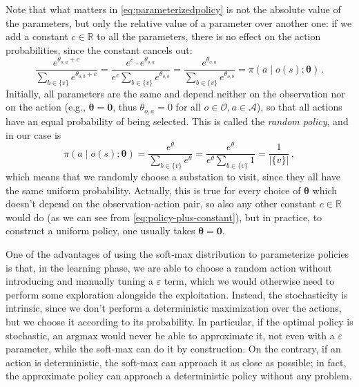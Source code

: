 Note that what matters in \eqref{eq:parameterizedpolicy} is not the absolute value of the parameters, but only the relative value of a parameter over another one: if we add a constant $c \in \mathbb R$ to all the parameters, there is no effect on the action probabilities, since the constant cancels out:
\begin{equation}
    \frac{e^{\theta_{o,a} + c}}{\sum_{b \in \{v\}} e^{\theta_{o,b} + c}}
    = \frac{e^c\cdot e^{\theta_{o,a} }}{e^c \sum_{b \in \{v\}} e^{\theta_{o,b}}}
    = \frac{e^{\theta_{o,a} }}{\sum_{b \in \{v\}} e^{\theta_{o,b} }}
    = \pi( a \mid o(s); \boldsymbol \theta) \, .
    \label{eq:policy-plus-constant}
\end{equation}
Initially, all parameters are the same and depend neither on the observation nor on the action (e.g., $\boldsymbol \theta = \mathbf 0$, thus $\theta_{o,a} = 0$ for all $o \in \mathcal O, a \in \mathcal A$), so that all actions have an equal probability of being selected. This is called the \emph{random policy}, and in our case is
\begin{equation}
    \pi \left( a \;\big|\; o(s); \boldsymbol \theta \right) = \frac{e^{\theta}}{\sum_{b \in \{v\}} e^{\theta}} = \frac{e^{\theta}}{e^\theta \sum_{b \in \{v\}} 1 } = \frac1{ |\{v\}| } \, ,
    \label{eq:rndpolicy}
\end{equation}
which means that we randomly choose a substation to visit, since they all have the same uniform probability. Actually, this is true for every choice of $\boldsymbol \theta$ which doesn't depend on the observation-action pair, so also any other constant $c \in \mathbb R$ would do (as we can see from \eqref{eq:policy-plus-constant}), but in practice, to construct a uniform policy, one usually takes $\boldsymbol \theta = \mathbf 0$.

One of the advantages of using the soft-max distribution to parameterize policies is that, in the learning phase, we are able to choose a random action without introducing and manually tuning a $\varepsilon$ term, which we would otherwise need to perform some exploration alongside the exploitation. Instead, the stochasticity is intrinsic, since we don't perform a deterministic maximization over the actions, but we choose it according to its probability. In particular, if the optimal policy is stochastic, an $\text{argmax}$ would never be able to approximate it, not even with a $\varepsilon$ parameter, while the soft-max can do it by construction. On the contrary, if an action is deterministic, the soft-max can approach it as close as possible; in fact, the approximate policy can approach a deterministic policy without any problem. 


